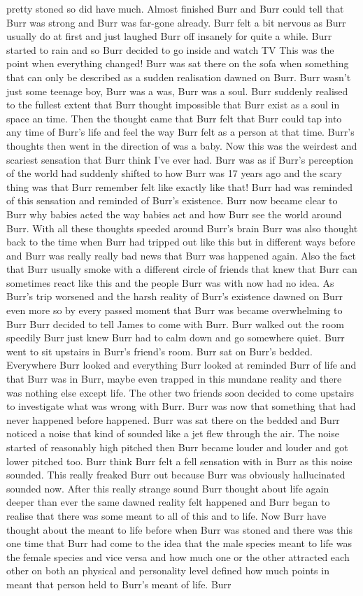 \documentclass[12pt]{book}
\begin{document}
pretty stoned so did have much. Almost finished Burr and Burr could tell that Burr was strong and Burr was far-gone already. Burr felt a bit nervous as Burr usually do at first and just laughed Burr off insanely for quite a while. Burr started to rain and so Burr decided to go inside and watch TV This was the point when everything changed! Burr was sat there on the sofa when something that can only be described as a sudden realisation dawned on Burr. Burr wasn't just some teenage boy, Burr was a was, Burr was a soul. Burr suddenly realised to the fullest extent that Burr thought impossible that Burr exist as a soul in space an time. Then the thought came that Burr felt that Burr could tap into any time of Burr's life and feel the way Burr felt as a person at that time. Burr's thoughts then went in the direction of was a baby. Now this was the weirdest and scariest sensation that Burr think I've ever had. Burr was as if Burr's perception of the world had suddenly shifted to how Burr was 17 years ago and the scary thing was that Burr remember felt like exactly like that! Burr had was reminded of this sensation and reminded of Burr's existence. Burr now became clear to Burr why babies acted the way babies act and how Burr see the world around Burr. With all these thoughts speeded around Burr's brain Burr was also thought back to the time when Burr had tripped out like this but in different ways before and Burr was really really bad news that Burr was happened again. Also the fact that Burr usually smoke with a different circle of friends that knew that Burr can sometimes react like this and the people Burr was with now had no idea. As Burr's trip worsened and the harsh reality of Burr's existence dawned on Burr even more so by every passed moment that Burr was became overwhelming to Burr Burr decided to tell James to come with Burr. Burr walked out the room speedily Burr just knew Burr had to calm down and go somewhere quiet. Burr went to sit upstairs in Burr's friend's room. Burr sat on Burr's bedded. Everywhere Burr looked and everything Burr looked at reminded Burr of life and that Burr was in Burr, maybe even trapped in this mundane reality and there was nothing else except life. The other two friends soon decided to come upstairs to investigate what was wrong with Burr. Burr was now that something that had never happened before happened. Burr was sat there on the bedded and Burr noticed a noise that kind of sounded like a jet flew through the air. The noise started of reasonably high pitched then Burr became louder and louder and got lower pitched too. Burr think Burr felt a fell sensation with in Burr as this noise sounded. This really freaked Burr out because Burr was obviously hallucinated sounded now. After this really strange sound Burr thought about life again deeper than ever the same dawned reality felt happened and Burr began to realise that there was some meant to all of this and to life. Now Burr have thought about the meant to life before when Burr was stoned and there was this one time that Burr had come to the idea that the male species meant to life was the female species and vice versa and how much one or the other attracted each other on both an physical and personality level defined how much points in meant that person held to Burr's meant of life. Burr 
\end{document}
